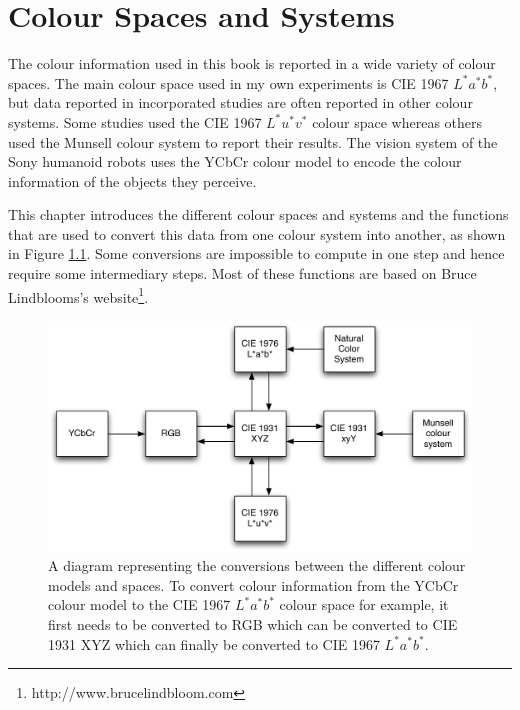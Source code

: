 \chapter{Colour Spaces and Systems}
\label{s:spaces}

The colour information used in this book is reported in a wide
variety of colour spaces. The main colour space used in my own
experiments is CIE 1967 $L^*a^*b^*$, but data reported in incorporated
studies are often reported in other colour systems. Some studies
\citep[e.g.][]{lillo07locating} used the CIE 1967 $L^*u^*v^*$ colour
space whereas others \citep[e.g.][]{sturges95location} used the
Munsell colour system to report their results. The vision system of
the Sony humanoid robots uses the YCbCr colour model to encode the
colour information of the objects they perceive.

This chapter introduces the different colour spaces and systems and
the functions that are used to convert this data from one colour
system into another, as shown in Figure \ref{f:conversions}. Some
conversions are impossible to compute in one step and hence require
some intermediary steps. Most of these functions are based on Bruce
Lindblooms's website\footnote{http://www.brucelindbloom.com}.

\begin{figure}[htb]
\begin{center}
\includegraphics[width=\textwidth]{./spaces/figures/conversions.pdf}
\caption[Conversion diagram between different colour models and
spaces]{A diagram representing the conversions between the different
  colour models and spaces. To convert colour information from the
  YCbCr colour model to the CIE 1967 $L^*a^*b^*$ colour space for
  example, it first needs to be converted to RGB which can be
  converted to CIE 1931 XYZ which can finally be converted to CIE 1967
  $L^*a^*b^*$.}
\label{f:conversions}
\end{center}
\end{figure}

